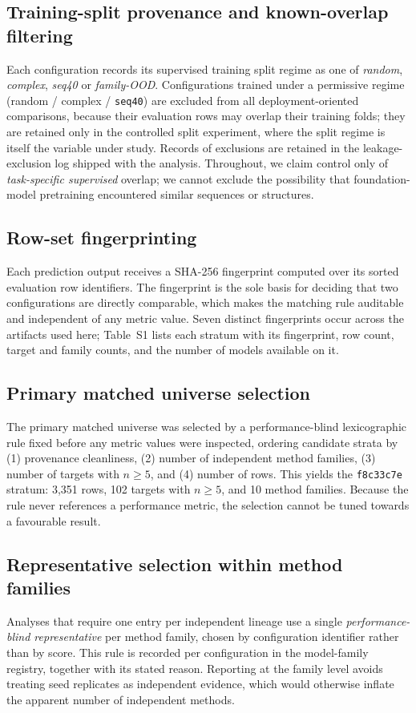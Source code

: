 \documentclass[11pt,a4paper]{article}
\begin{document}
\subsection*{Training-split provenance and known-overlap filtering}
Each configuration records its supervised training split regime as one of
\emph{random}, \emph{complex}, \emph{seq40} or \emph{family-OOD}. Configurations trained
under a permissive regime (random / complex / \texttt{seq40}) are excluded from all
deployment-oriented comparisons, because their evaluation rows may overlap their training
folds; they are retained only in the controlled split experiment, where the split regime is
itself the variable under study. Records of exclusions are retained in the leakage-exclusion
log shipped with the analysis. Throughout, we claim control only of \emph{task-specific
supervised} overlap; we cannot exclude the possibility that foundation-model pretraining
encountered similar sequences or structures.

\subsection*{Row-set fingerprinting}
Each prediction output receives a SHA-256 fingerprint computed over its sorted evaluation
row identifiers. The fingerprint is the sole basis for deciding that two configurations are
directly comparable, which makes the matching rule auditable and independent of any metric
value. Seven distinct fingerprints occur across the artifacts used here; Table~S1 lists each
stratum with its fingerprint, row count, target and family counts, and the number of models
available on it.

\subsection*{Primary matched universe selection}
The primary matched universe was selected by a performance-blind lexicographic rule fixed
before any metric values were inspected, ordering candidate strata by (1) provenance
cleanliness, (2) number of independent method families, (3) number of targets with
$n \geq 5$, and (4) number of rows. This yields the \texttt{f8c33c7e} stratum: 3{,}351 rows,
102 targets with $n \geq 5$, and 10 method families. Because the rule never references a
performance metric, the selection cannot be tuned towards a favourable result.

\subsection*{Representative selection within method families}
Analyses that require one entry per independent lineage use a single
\emph{performance-blind representative} per method family, chosen by configuration
identifier rather than by score. This rule is recorded per configuration in the model-family
registry, together with its stated reason. Reporting at the family level avoids treating
seed replicates as independent evidence, which would otherwise inflate the apparent number
of independent methods.
\end{document}
